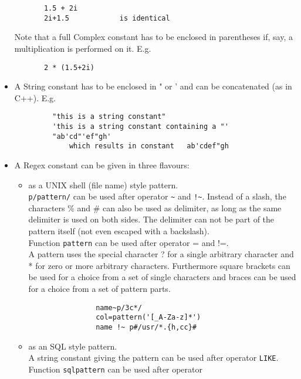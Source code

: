 \begin{itemize}
\begin{verbatim}
       1.5 + 2i
       2i+1.5            is identical
       \end{verbatim}
       Note that a full Complex constant has to be enclosed
       in parentheses if, say, a multiplication is performed on it. E.g.
       \begin{verbatim}
       2 * (1.5+2i)
       \end{verbatim}
  \item A String constant has to be enclosed in " or ' and can be
       concatenated (as in C++). E.g.
       \begin{verbatim}
         "this is a string constant"
         'this is a string constant containing a "'
         "ab'cd"'ef"gh'
             which results in constant   ab'cdef"gh
       \end{verbatim}
  \item A Regex constant can be given in three flavours:
        \begin{itemize}
        \item as a UNIX shell (file name) style pattern.
              \\\texttt{p/pattern/} can be used after operator \verb+~+
              and \verb+!~+.
              Instead of a slash, the characters \% and \# can also be used as
              delimiter, as long as the same delimiter is used on both sides.
              The delimiter can not be part of the pattern itself
              (not even escaped with a backslash).
              \\Function \texttt{pattern} can be used after operator = and !=.
              \\A pattern uses the special character ? for a single
              arbitrary character
              and * for zero or more arbitrary characters. Furthermore
              square brackets can be used for a choice from a set of single
              characters and braces can be used for a choice from a
              set of pattern parts. 
              \begin{verbatim}
                name~p/3c*/
                col=pattern('[_A-Za-z]*')
                name !~ p#/usr/*.{h,cc}#
              \end{verbatim}
        \item as an SQL style pattern.
              \\A string constant giving the pattern can be used after
              operator \texttt{LIKE}.
              \\Function \texttt{sqlpattern} can be used after operator

\end{itemize}
\end{itemize}
